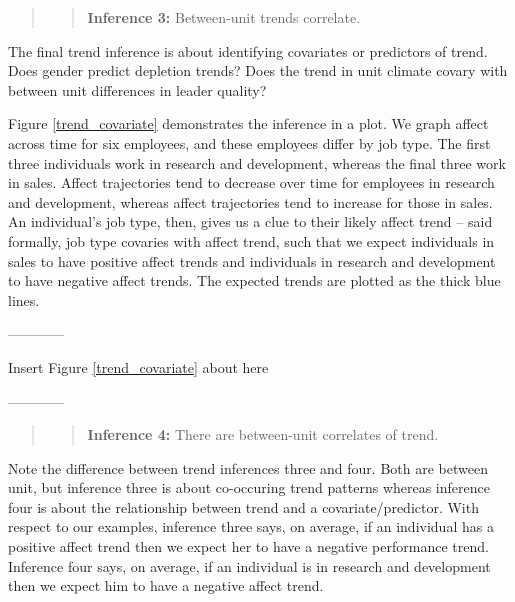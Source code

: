 \documentclass[english,,man]{apa6}
\theoremstyle{definition}
\theoremstyle{definition}
\theoremstyle{definition}
\theoremstyle{remark}
\begin{document}
\begin{quote}
\begin{quote}
\textbf{Inference 3:} Between-unit trends correlate.
\end{quote}
\end{quote}

The final trend inference is about identifying covariates or predictors
of trend. Does gender predict depletion trends? Does the trend in unit
climate covary with between unit differences in leader quality?

Figure \ref{trend_covariate} demonstrates the inference in a plot. We
graph affect across time for six employees, and these employees differ
by job type. The first three individuals work in research and
development, whereas the final three work in sales. Affect trajectories
tend to decrease over time for employees in research and development,
whereas affect trajectories tend to increase for those in sales. An
individual's job type, then, gives us a clue to their likely affect
trend -- said formally, job type covaries with affect trend, such that
we expect individuals in sales to have positive affect trends and
individuals in research and development to have negative affect trends.
The expected trends are plotted as the thick blue lines.

\begin{center}

------------

Insert Figure \ref{trend_covariate} about here

------------

\end{center}

\begin{quote}
\begin{quote}
\textbf{Inference 4:} There are between-unit correlates of trend.
\end{quote}
\end{quote}

Note the difference between trend inferences three and four. Both are
between unit, but inference three is about co-occuring trend patterns
whereas inference four is about the relationship between trend and a
covariate/predictor. With respect to our examples, inference three says,
on average, if an individual has a positive affect trend then we expect
her to have a negative performance trend. Inference four says, on
average, if an individual is in research and development then we expect
him to have a negative affect trend.
\end{document}
